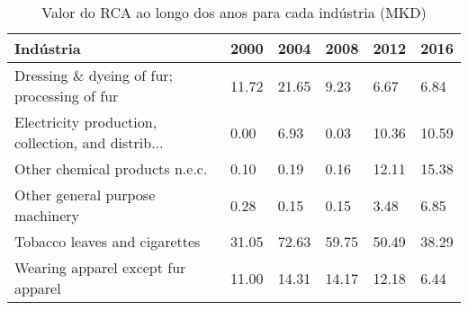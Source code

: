 \begin{table}
\centering
\caption{Valor do RCA ao longo dos anos para cada indústria (MKD)}
\label{tab:ex3-tempo-MKD}
\begin{tabular}{p{6cm}p{1.5cm}p{1.5cm}p{1.5cm}p{1.5cm}p{1.5cm}}
\toprule
                                         Indústria &  2000 &  2004 &  2008 &  2012 &  2016 \\
\midrule
       Dressing \& dyeing of fur; processing of fur & 11.72 & 21.65 &  9.23 &  6.67 &  6.84 \\
Electricity production, collection, and distrib... &  0.00 &  6.93 &  0.03 & 10.36 & 10.59 \\
                    Other chemical products n.e.c. &  0.10 &  0.19 &  0.16 & 12.11 & 15.38 \\
                   Other general purpose machinery &  0.28 &  0.15 &  0.15 &  3.48 &  6.85 \\
                     Tobacco leaves and cigarettes & 31.05 & 72.63 & 59.75 & 50.49 & 38.29 \\
                Wearing apparel except fur apparel & 11.00 & 14.31 & 14.17 & 12.18 &  6.44 \\
\bottomrule
\end{tabular}
\end{table}
